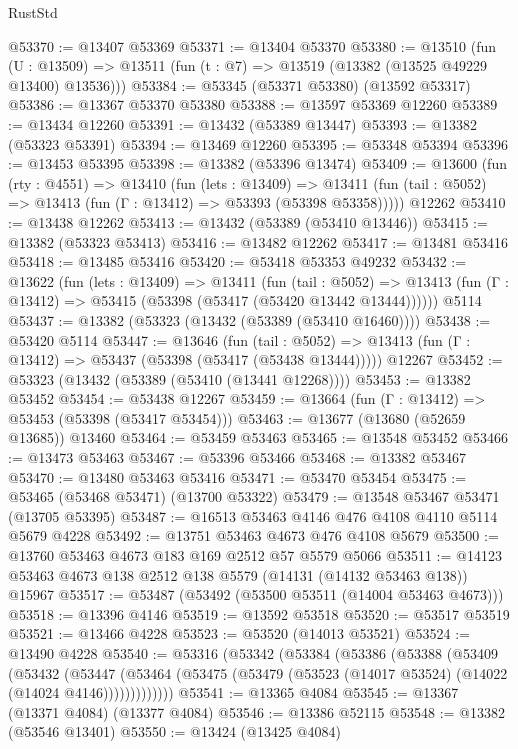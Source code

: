 \begin{lexlean}{RustStd}
\begin{coremodule}
@53370 := @13407 @53369
@53371 := @13404 @53370
@53380 := @13510
    (fun (U : @13509) => @13511 (fun (t : @7) => @13519 (@13382 (@13525 @49229 @13400) @13536)))
@53384 := @53345 (@53371 @53380) (@13592 @53317)
@53386 := @13367 @53370 @53380
@53388 := @13597 @53369 @12260
@53389 := @13434 @12260
@53391 := @13432 (@53389 @13447)
@53393 := @13382 (@53323 @53391)
@53394 := @13469 @12260
@53395 := @53348 @53394
@53396 := @13453 @53395
@53398 := @13382 (@53396 @13474)
@53409 := @13600
    (fun (rty : @4551) =>
    @13410
      (fun (lets : @13409) =>
      @13411 (fun (tail : @5052) => @13413 (fun (Γ : @13412) => @53393 (@53398 @53358)))))
    @12262
@53410 := @13438 @12262
@53413 := @13432 (@53389 (@53410 @13446))
@53415 := @13382 (@53323 @53413)
@53416 := @13482 @12262
@53417 := @13481 @53416
@53418 := @13485 @53416
@53420 := @53418 @53353 @49232
@53432 := @13622
    (fun (lets : @13409) =>
    @13411
      (fun (tail : @5052) =>
      @13413 (fun (Γ : @13412) => @53415 (@53398 (@53417 (@53420 @13442 @13444))))))
    @5114
@53437 := @13382 (@53323 (@13432 (@53389 (@53410 @16460))))
@53438 := @53420 @5114
@53447 := @13646
    (fun (tail : @5052) => @13413 (fun (Γ : @13412) => @53437 (@53398 (@53417 (@53438 @13444)))))
    @12267
@53452 := @53323 (@13432 (@53389 (@53410 (@13441 @12268))))
@53453 := @13382 @53452
@53454 := @53438 @12267
@53459 := @13664 (fun (Γ : @13412) => @53453 (@53398 (@53417 @53454)))
@53463 := @13677 (@13680 (@52659 @13685)) @13460
@53464 := @53459 @53463
@53465 := @13548 @53452
@53466 := @13473 @53463
@53467 := @53396 @53466
@53468 := @13382 @53467
@53470 := @13480 @53463 @53416
@53471 := @53470 @53454
@53475 := @53465 (@53468 @53471) (@13700 @53322)
@53479 := @13548 @53467 @53471 (@13705 @53395)
@53487 := @16513 @53463 @4146 @476 @4108 @4110 @5114 @5679 @4228
@53492 := @13751 @53463 @4673 @476 @4108 @5679
@53500 := @13760 @53463 @4673 @183 @169 @2512 @57 @5579 @5066
@53511 := @14123 @53463 @4673 @138 @2512 @138 @5579 (@14131 (@14132 @53463 @138)) @15967
@53517 := @53487 (@53492 (@53500 @53511 (@14004 @53463 @4673)))
@53518 := @13396 @4146
@53519 := @13592 @53518
@53520 := @53517 @53519
@53521 := @13466 @4228
@53523 := @53520 (@14013 @53521)
@53524 := @13490 @4228
@53540 := @53316
    (@53342
      (@53384
        (@53386
          (@53388
            (@53409
              (@53432
                (@53447
                  (@53464 (@53475 (@53479 (@53523 (@14017 @53524) (@14022 (@14024 @4146)))))))))))))
@53541 := @13365 @4084
@53545 := @13367 (@13371 @4084) (@13377 @4084)
@53546 := @13386 @52115
@53548 := @13382 (@53546 @13401)
@53550 := @13424 (@13425 @4084)

\end{coremodule}
\end{lexlean}
